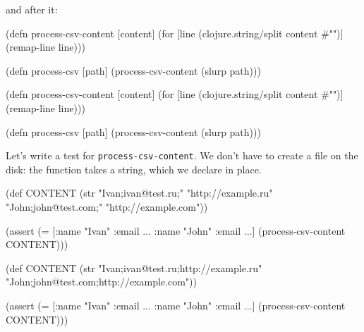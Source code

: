 \fi

\noindent
and after it:

\ifnarrow

\begin{english}
  \begin{clojure}
(defn process-csv-content [content]
  (for [line (clojure.string/split
               content #"\n")]
    (remap-line line)))

(defn process-csv [path]
  (process-csv-content (slurp path)))
  \end{clojure}
\end{english}

\else

\begin{english}
  \begin{clojure}
(defn process-csv-content [content]
  (for [line (clojure.string/split content #"\n")]
    (remap-line line)))

(defn process-csv [path]
  (process-csv-content (slurp path)))
  \end{clojure}
\end{english}

\fi

Let's write a test for \verb|process-csv-content|. We don't have to create a file on the disk: the function takes a string, which we declare in place.

\ifnarrow

\begin{english}
  \begin{clojure}
(def CONTENT
  (str "Ivan;ivan@test.ru;"
       "http://example.ru"
       \newline
       "John;john@test.com;"
       "http://example.com"))

(assert
  (= [{:name "Ivan" :email ...}
      {:name "John" :email ...}]
     (process-csv-content CONTENT)))
  \end{clojure}
\end{english}

\else

\begin{english}
  \begin{clojure}
(def CONTENT
  (str "Ivan;ivan@test.ru;http://example.ru"
       \newline
       "John;john@test.com;http://example.com"))

(assert (= [{:name "Ivan" :email ...}
            {:name "John" :email ...}]
           (process-csv-content CONTENT)))
  \end{clojure}
\end{english}


